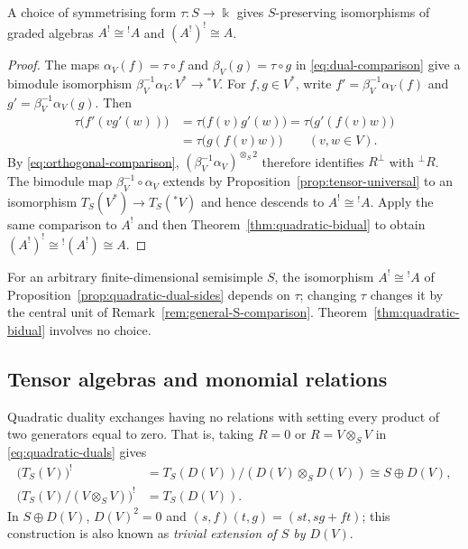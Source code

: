 \begin{advanced}
\begin{proposition}\label{prop:quadratic-dual-sides}
A choice of symmetrising form $\tau:S\to\Bbbk$ gives $S$-preserving isomorphisms of graded algebras $A^!\cong{}^!A$ and $(A^!)^!\cong A$.
\end{proposition}

\begin{proof}
The maps $\alpha_V(f)=\tau\circ f$ and $\beta_V(g)=\tau\circ g$ in \eqref{eq:dual-comparison} give a bimodule isomorphism $\beta_V^{-1}\alpha_V:V^*\to{}^*V$.
For $f,g\in V^*$, write $f'=\beta_V^{-1}\alpha_V(f)$ and $g'=\beta_V^{-1}\alpha_V(g)$. Then
\[
\begin{aligned}
\tau\bigl(f'(vg'(w))\bigr)
&=\tau\bigl(f(v)g'(w)\bigr)
=\tau\bigl(g'(f(v)w)\bigr)\\
&=\tau\bigl(g(f(v)w)\bigr)
\qquad(v,w\in V).
\end{aligned}
\]
By \eqref{eq:orthogonal-comparison}, $(\beta_V^{-1}\alpha_V)^{\otimes_S2}$ therefore identifies $R^\perp$ with ${}^\perp R$.
The bimodule map $\beta_V^{-1}\circ\alpha_V$ extends by Proposition~\ref{prop:tensor-universal} to an isomorphism $T_S(V^*)\to T_S({}^*V)$ and hence descends to $A^!\cong{}^!A$.
Apply the same comparison to $A^!$ and then Theorem~\ref{thm:quadratic-bidual} to obtain $(A^!)^!\cong{}^!(A^!)\cong A$.
\end{proof}

For an arbitrary finite-dimensional semisimple $S$, the isomorphism $A^!\cong{}^!A$ of Proposition~\ref{prop:quadratic-dual-sides} depends on $\tau$; changing $\tau$ changes it by the central unit of Remark~\ref{rem:general-S-comparison}.
Theorem~\ref{thm:quadratic-bidual} involves no choice.
\end{advanced}

\subsection{Tensor algebras and monomial relations}

\begin{example}\label{ex:tensor-square-zero-dual}
Quadratic duality exchanges having no relations with setting every product of two generators equal to zero.
That is, taking $R=0$ or $R=V\otimes_S V$ in \eqref{eq:quadratic-duals} gives
\[
\begin{aligned}
\bigl(T_S(V)\bigr)^!
&=T_S(D(V))/(D(V)\otimes_S D(V))\cong S\oplus D(V),\\
\bigl(T_S(V)/(V\otimes_S V)\bigr)^!&=T_S(D(V)).
\end{aligned}
\]
In $S\oplus D(V)$, $D(V)^2=0$ and $(s,f)(t,g)=(st,sg+ft)$; this construction is also known as \emph{trivial extension of $S$ by $D(V)$}.
\end{example}

